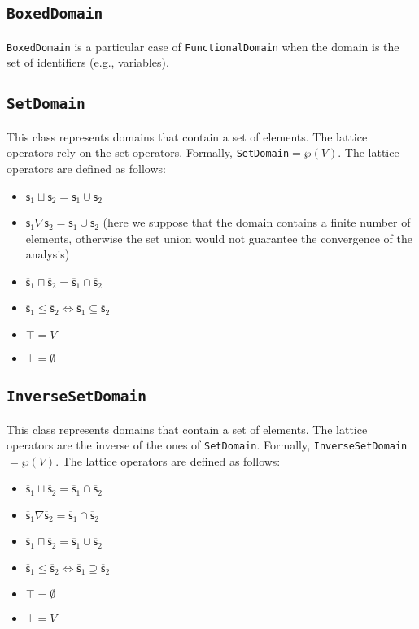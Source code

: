 \documentclass[11pt]{article}
\newcommand{\statement}[1]{\lstinline{#1}}
\newcommand{\cel}[1]{\ensuremath{\mathsf{#1}}}
\newcommand{\ael}[1]{\cel{\overline{#1}}}
\begin{document}
\subsection{\statement{BoxedDomain}}
\statement{BoxedDomain} is a particular case of \statement{FunctionalDomain} when the domain is the set of identifiers (e.g., variables).

\subsection{\statement{SetDomain}}
This class represents domains that contain a set of elements. The lattice operators rely on the set operators. Formally, \statement{SetDomain}$=\wp(V)$. The lattice operators are defined as follows:
\begin{itemize}
\item $\ael{s}_1 \sqcup \ael{s}_2 = \ael{s}_1 \cup \ael{s}_2$
\item $\ael{s}_1 \nabla \ael{s}_2 = \ael{s}_1 \cup \ael{s}_2$ (here we suppose that the domain contains a finite number of elements, otherwise the set union would not guarantee the convergence of the analysis)
\item $\ael{s}_1 \sqcap \ael{s}_2 = \ael{s}_1 \cap \ael{s}_2$
\item $\ael{s}_1 \leq \ael{s}_2 \Leftrightarrow \ael{s}_1 \subseteq \ael{s}_2$
\item $\top = V$
\item $\bot = \emptyset$
\end{itemize}


\subsection{\statement{InverseSetDomain}}
This class represents domains that contain a set of elements. The lattice operators are the inverse of the ones of \statement{SetDomain}. Formally, \statement{InverseSetDomain}$=\wp(V)$. The lattice operators are defined as follows:
\begin{itemize}
\item $\ael{s}_1 \sqcup \ael{s}_2 = \ael{s}_1 \cap \ael{s}_2$
\item $\ael{s}_1 \nabla \ael{s}_2 = \ael{s}_1 \cap \ael{s}_2$
\item $\ael{s}_1 \sqcap \ael{s}_2 = \ael{s}_1 \cup \ael{s}_2$
\item $\ael{s}_1 \leq \ael{s}_2 \Leftrightarrow \ael{s}_1 \supseteq \ael{s}_2$
\item $\top = \emptyset$
\item $\bot = V$
\end{itemize}
\end{document}
